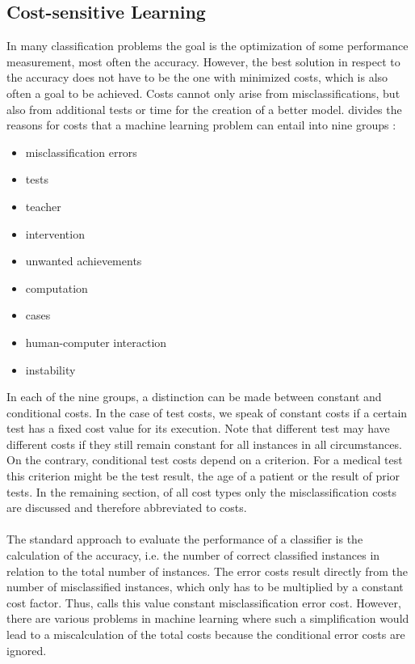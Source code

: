 \documentclass[article,type=msc,colorback,accentcolor=tud7b]{tudthesis}
\begin{document}
  \subsection{Cost-sensitive Learning}
  \label{subsec:cost_sensitive_learning}
    In many classification problems the goal is the optimization of some performance measurement, most often the accuracy. However, the best solution in respect to the accuracy does not have to be the one with minimized costs, which is also often a goal to be achieved. Costs cannot only arise from misclassifications, but also from additional tests or time for the creation of a better model. \citeauthor{Turney2002} divides the reasons for costs that a machine learning problem can entail into nine groups \autocite{Turney2002}:
    \begin{itemize}[noitemsep]
      \item misclassification errors
      \item tests
      \item teacher
      \item intervention
      \item unwanted achievements
      \item computation
      \item cases
      \item human-computer interaction
      \item instability
    \end{itemize}
    In each of the nine groups, a distinction can be made between constant and conditional costs. In the case of test costs, we speak of constant costs if a certain test has a fixed cost value for its execution. Note that different test may have different costs if they still remain constant for all instances in all circumstances. On the contrary, conditional test costs depend on a criterion. For a medical test this criterion might be the test result, the age of a patient or the result of prior tests. In the remaining section, of all cost types only the misclassification costs are discussed and therefore abbreviated to costs. \\\\
    The standard approach to evaluate the performance of a classifier is the calculation of the accuracy, i.e. the number of correct classified instances in relation to the total number of instances. The error costs result directly from the number of misclassified instances, which only has to be multiplied by a constant cost factor. Thus, \citeauthor{Turney2002} calls this value constant misclassification error cost. However, there are various problems in machine learning where such a simplification would lead to a miscalculation of the total costs because the conditional error costs are ignored. \\\\
\end{document}
